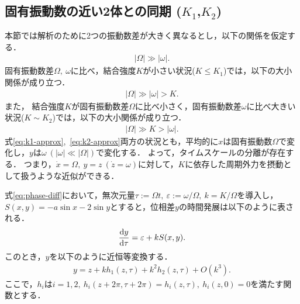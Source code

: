 \documentclass[../main]{subfiles}
\begin{document}
    \subsection{固有振動数の近い2体との同期 ($K_1$,$K_2$)}
    \label{sec:3body-k12}
    本節では解析のために2つの振動数差が大きく異なるとし，以下の関係を仮定する．
    \begin{align}
        \label{eq:assume}
        |\Omega|\gg|\omega|.
    \end{align}
    固有振動数差$\Omega,\ \omega$に比べ，結合強度$K$が小さい状況($K\leq K_1$)では，以下の大小関係が成り立つ．
    \begin{align}
        \label{eq:k1-approx}
        |\Omega|\gg|\omega|>K.
    \end{align}
    また，
    結合強度$K$が固有振動数差$\Omega$に比べ小さく，固有振動数差$\omega$に比べ大きい状況($K\sim K_2$)では，以下の大小関係が成り立つ．
    \begin{align}
        \label{eq:k2-approx}
        |\Omega|\gg K>|\omega|.
    \end{align}
    式\eqref{eq:k1-approx},\ \eqref{eq:k2-approx}両方の状況とも，平均的に$x$は固有振動数$\Omega$で変化し，$y$は$\omega\ (|\omega|\ll|\Omega|)$で変化する．
    よって，タイムスケールの分離が存在する．
    つまり，$\dot{x}=\Omega,\ y=z\ (\dot{z}=\omega)$に対して，$K$に依存した周期外力を摂動として扱うような近似ができる．

    式\eqref{eq:phase-diff}において，無次元量$\tau:=\Omega t,\ \varepsilon:=\omega/\Omega,\ k=K/\Omega$を導入し，$S(x,y)=-a\sin x-2\sin y$とすると，位相差$y$の時間発展は以下のように表される．
    \begin{align}
        \dv{y}{\tau}=\varepsilon+k S(x,y).
    \end{align}
    このとき，$y$を以下のように近恒等変換する．
    \begin{align}
        y=z+kh_1(z,\tau)+k^2h_2(z,\tau)+O(k^3).
        \label{eq:pertu-ytilde}
    \end{align}
    ここで，$h_i$は$i=1,2,\ h_i(z+2\pi,\tau+2\pi)=h_i(z,\tau),\ h_i(z,0)=0$を満たす関数とする．
\end{document}
